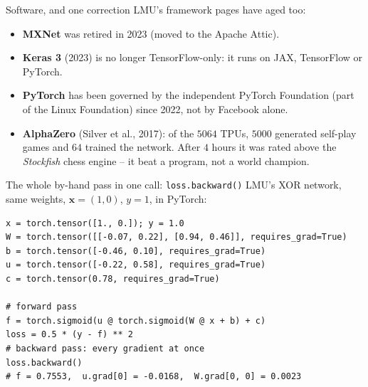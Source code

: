\documentclass[aspectratio=43]{beamer}
\begin{document}
\begin{frame}{Software, and one correction}
  \small
  LMU's framework pages have aged too:
  \vfill
  \begin{itemize}\footnotesize
    \item \textbf{MXNet} was retired in 2023 (moved to the Apache Attic).
    \item \textbf{Keras 3} (2023) is no longer TensorFlow-only: it runs on JAX, TensorFlow or
      PyTorch.
    \item \textbf{PyTorch} has been governed by the independent PyTorch Foundation (part of the
      Linux Foundation) since 2022, not by Facebook alone.
    \item \textbf{AlphaZero} (Silver et al., 2017): of the $5064$ TPUs, $5000$ generated
      self-play games and $64$ trained the network. After $4$ hours it was rated above the
      \emph{Stockfish} chess engine -- it beat a program, not a world champion.
  \end{itemize}
  \vfill
\end{frame}

\begin{frame}[fragile]{The whole by-hand pass in one call: \texttt{loss.backward()}}
  \small
  LMU's XOR network, same weights, $\mathbf{x} = (1, 0)$, $y = 1$, in PyTorch:
  \vskip 2pt
\begin{lstlisting}
x = torch.tensor([1., 0.]); y = 1.0
W = torch.tensor([[-0.07, 0.22], [0.94, 0.46]], requires_grad=True)
b = torch.tensor([-0.46, 0.10], requires_grad=True)
u = torch.tensor([-0.22, 0.58], requires_grad=True)
c = torch.tensor(0.78, requires_grad=True)

# forward pass
f = torch.sigmoid(u @ torch.sigmoid(W @ x + b) + c)
loss = 0.5 * (y - f) ** 2
# backward pass: every gradient at once
loss.backward()
# f = 0.7553,  u.grad[0] = -0.0168,  W.grad[0, 0] = 0.0023
\end{lstlisting}
  \vfill
\end{frame}
\end{document}
